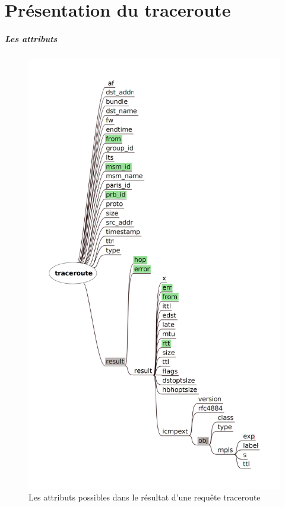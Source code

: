 \chapter{Présentation du traceroute}

\paragraph{Les attributs } \label{annexe:traceroute-attributes}

\begin{figure}[H]
	\centering
	\includegraphics[width=0.7\linewidth]{illustrations/traceroute_attributes}
	\caption{Les attributs possibles dans le résultat d'une requête traceroute}
	\label{fig:traceroute_attributes}
\end{figure}